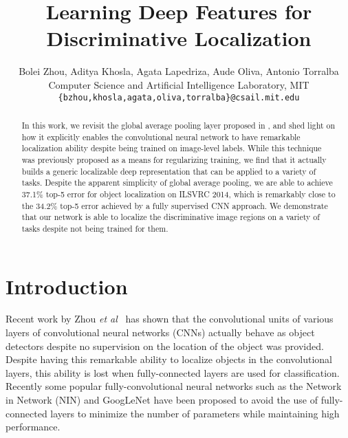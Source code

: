 \documentclass[10pt,twocolumn,letterpaper]{article}
\begin{document}
\title{Learning Deep Features for Discriminative Localization}

\author{
Bolei Zhou, Aditya Khosla, Agata Lapedriza, Aude Oliva, Antonio Torralba \\
Computer Science and Artificial Intelligence Laboratory, MIT\\
\texttt{\{bzhou,khosla,agata,oliva,torralba\}@csail.mit.edu}
}

\maketitle



\begin{abstract}

In this work, we revisit the global average pooling layer proposed in \cite{lin2013network}, and shed light on how it explicitly enables the convolutional neural network to have remarkable localization ability despite being trained on image-level labels. While this technique was previously proposed as a means for regularizing training, we find that it actually builds a generic localizable deep representation that can be applied to a variety of tasks. Despite the apparent simplicity of global average pooling, we are able to achieve 37.1\% top-5 error for object localization on ILSVRC 2014, which is remarkably close to the 34.2\% top-5 error achieved by a fully supervised CNN approach. We demonstrate that our network is able to localize the discriminative image regions on a variety of tasks despite not being trained for them.




\end{abstract}

\section{Introduction}







Recent work by Zhou \textit{et al}~\cite{zhou2014object} has shown that the convolutional units of various layers of convolutional neural networks (CNNs) actually behave as object detectors despite no supervision on the location of the object was provided. Despite having this remarkable ability to localize objects in the convolutional layers, this ability is lost when fully-connected layers are used for classification. Recently some popular fully-convolutional neural networks such as the Network in Network (NIN) \cite{lin2013network} and GoogLeNet \cite{szegedy2014going} have been proposed to avoid the use of fully-connected layers to minimize the number of parameters while maintaining high performance. 
\end{document}
